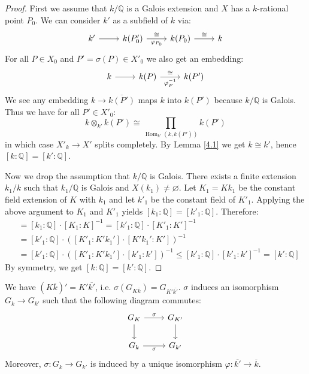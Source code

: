 \begin{proof}
First we assume that $k/\mathbb{Q}$ is a Galois extension and $X$ has a $k$-rational point $P_0$. We can consider $k'$ as a subfield of $k$ via: 
\[\begin{tikzcd}
k'\ar[r] & k(P'_0)\ar[r, "\varphi_{P_0}"', "\cong"] & k(P_0) \ar[r, "\cong"] & k
\end{tikzcd}\]
For all $P\in X_0$ and $P'=\sigma(P)\in X'_0$ we also get an embedding:
\[ \begin{tikzcd}
k \ar[r] & k(P) \ar[r, "\varphi_P^{-1}"', "\cong"] & k(P')
\end{tikzcd} \]
We see any embedding $k\to \overline{k(P')}$ maps $k$ into $k(P')$ because $k/\mathbb{Q}$ is Galois. Thus we have for all $P'\in X'_0$:
\[ k\otimes_{k'} k(P')\cong \prod_{\operatorname{Hom}_{k'}(k, k(P'))} k(P') \]
in which case $X'_k\to X'$ splits completely. By Lemma \ref{4.1} we get $k\cong k'$, hence $[k:\mathbb{Q}]= [k':\mathbb{Q}]$.

Now we drop the assumption that $k/\mathbb{Q}$ is Galois. There exists a finite extension $k_1/k$ such that $k_1/\mathbb{Q}$ is Galois and $X(k_1)\neq\varnothing$. Let $K_1 = Kk_1$ be the constant field extension of $K$ with $k_1$ and let $k'_1$ be the constant field of $K'_1$. Applying the above argument to $K_1$ and $K'_1$ yields $[k_1:\mathbb{Q}] = [k'_1:\mathbb{Q}]$. Therefore:
\begin{align*}
[k:\mathbb{Q}] &= [k_1:\mathbb{Q}]\cdot [K_1:K]^{-1} = [k'_1:\mathbb{Q}]\cdot [K'_1:K']^{-1}\\
&= [k'_1:\mathbb{Q}]\cdot ([K'_1: K'k_1'] \cdot [K'k_1':K'])^{-1}\\
&= [k'_1:\mathbb{Q}]\cdot  ([K'_1: K'k_1'] \cdot [k'_1:k'])^{-1} \leq [k'_1:\mathbb{Q}]\cdot [k'_1:k']^{-1} = [k':\mathbb{Q}]
\end{align*}
By symmetry, we get $[k:\mathbb{Q}] = [k':\mathbb{Q}]$.
\end{proof}

\begin{lemma}\label{4.2}
We have $(K\overline{k})'=K'\overline{k'}$, i.e. $\sigma(G_{K\overline{k}})=G_{K'\overline{k'}}$. $\sigma$ induces an isomorphism $G_k\to G_{k'}$ such that the following diagram commutes:
\[ \begin{tikzcd}
G_K \ar[r, "\sigma"] \ar[d] & G_{K'}\ar[d]\\
G_k \ar[r, "\sigma"'] & G_{k'}
\end{tikzcd} \]
Moreover, $\sigma:G_k\to G_{k'}$ is induced by a unique isomorphism $\varphi:\overline{k'}\to\overline{k}$.
\end{lemma}


